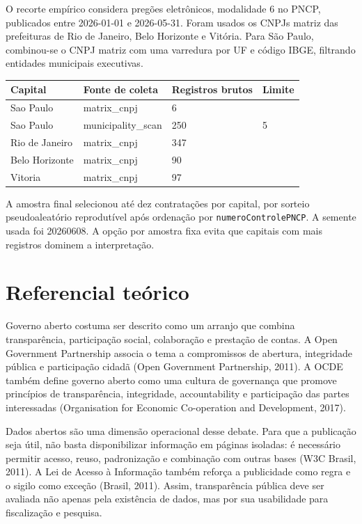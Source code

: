 \documentclass[12pt]{article}
\newcounter{none}
\begin{document}
O recorte empírico considera pregões eletrônicos, modalidade 6 no PNCP,
publicados entre 2026-01-01 e 2026-05-31. Foram usados os CNPJs matriz
das prefeituras de Rio de Janeiro, Belo Horizonte e Vitória. Para São
Paulo, combinou-se o CNPJ matriz com uma varredura por UF e código IBGE,
filtrando entidades municipais executivas.

{\def\LTcaptype{none} %
\begin{longtable}[]{@{}llll@{}}
\toprule\noalign{}
Capital & Fonte de coleta & Registros brutos & Limite \\
\midrule\noalign{}
\endhead
\bottomrule\noalign{}
\endlastfoot
Sao Paulo & matrix\_cnpj & 6 & \\
Sao Paulo & municipality\_scan & 250 & 5 \\
Rio de Janeiro & matrix\_cnpj & 347 & \\
Belo Horizonte & matrix\_cnpj & 90 & \\
Vitoria & matrix\_cnpj & 97 & \\
\end{longtable}
}

A amostra final selecionou até dez contratações por capital, por sorteio
pseudoaleatório reprodutível após ordenação por
\texttt{numeroControlePNCP}. A semente usada foi 20260608. A opção por
amostra fixa evita que capitais com mais registros dominem a
interpretação.

\section{Referencial teórico}\label{referencial-teuxf3rico}

Governo aberto costuma ser descrito como um arranjo que combina
transparência, participação social, colaboração e prestação de contas. A
Open Government Partnership associa o tema a compromissos de abertura,
integridade pública e participação cidadã (Open Government Partnership,
2011). A OCDE também define governo aberto como uma cultura de
governança que promove princípios de transparência, integridade,
accountability e participação das partes interessadas (Organisation for
Economic Co-operation and Development, 2017).

Dados abertos são uma dimensão operacional desse debate. Para que a
publicação seja útil, não basta disponibilizar informação em páginas
isoladas: é necessário permitir acesso, reuso, padronização e combinação
com outras bases (W3C Brasil, 2011). A Lei de Acesso à Informação também
reforça a publicidade como regra e o sigilo como exceção (Brasil, 2011).
Assim, transparência pública deve ser avaliada não apenas pela
existência de dados, mas por sua usabilidade para fiscalização e
pesquisa.
\end{document}
